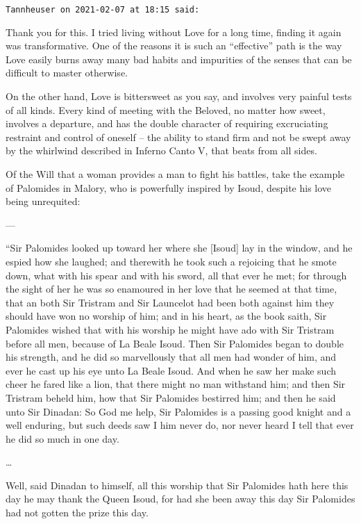 \begin{footnotesize}\begin{sffamily}



\texttt{Tannheuser on 2021-02-07 at 18:15 said: }

Thank you for this. I tried living without Love for a long time, finding it again was transformative. One of the reasons it is such an “effective” path is the way Love easily burns away many bad habits and impurities of the senses that can be difficult to master otherwise.

On the other hand, Love is bittersweet as you say, and involves very painful tests of all kinds. Every kind of meeting with the Beloved, no matter how sweet, involves a departure, and has the double character of requiring excruciating restraint and control of oneself – the ability to stand firm and not be swept away by the whirlwind described in Inferno Canto V, that beats from all sides.

Of the Will that a woman provides a man to fight his battles, take the example of Palomides in Malory, who is powerfully inspired by Isoud, despite his love being unrequited:

—

“Sir Palomides looked up toward her where she [Isoud] lay in the window, and he espied how she laughed; and therewith he took such a rejoicing that he smote down, what with his spear and with his sword, all that ever he met; for through the sight of her he was so enamoured in her love that he seemed at that time, that an both Sir Tristram and Sir Launcelot had been both against him they should have won no worship of him; and in his heart, as the book saith, Sir Palomides wished that with his worship he might have ado with Sir Tristram before all men, because of La Beale Isoud. Then Sir Palomides began to double his strength, and he did so marvellously that all men had wonder of him, and ever he cast up his eye unto La Beale Isoud. And when he saw her make such cheer he fared like a lion, that there might no man withstand him; and then Sir Tristram beheld him, how that Sir Palomides bestirred him; and then he said unto Sir Dinadan: So God me help, Sir Palomides is a passing good knight and a well enduring, but such deeds saw I him never do, nor never heard I tell that ever he did so much in one day.

…

Well, said Dinadan to himself, all this worship that Sir Palomides hath here this day he may thank the Queen Isoud, for had she been away this day Sir Palomides had not gotten the prize this day.


\end{sffamily}
\end{footnotesize}
